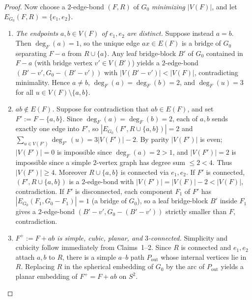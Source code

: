 \documentclass[11pt,reqno]{amsart}
\theoremstyle{plain}
\theoremstyle{definition}
\theoremstyle{remark}
\DeclareRobustCommand{\_}{\ifmmode\text{\textunderscore}\else\textunderscore\allowbreak\fi}
\begin{document}
\begin{proof}
Now choose a $2$-edge-bond $(F, R)$ of $G_0$ \emph{minimizing $|V(F)|$}, and let $E_{G_0}(F, R) = \{e_1, e_2\}$.
\begin{enumerate}[label=\textbf{Claim \arabic*.},leftmargin=4.8em]
  \item \emph{The endpoints $a, b \in V(F)$ of $e_1, e_2$ are distinct.} Suppose instead $a = b$. Then $\deg_F(a) = 1$, so the unique edge $ax \in E(F)$ is a bridge of $G_0$ separating $F - a$ from $R \cup \{a\}$. Any leaf bridge-block $B'$ of $G_0$ contained in $F - a$ (with bridge vertex $v' \in V(B')$) yields a $2$-edge-bond $(B' - v', G_0 - (B' - v'))$ with $|V(B' - v')| < |V(F)|$, contradicting minimality. Hence $a \neq b$, $\deg_F(a) = \deg_F(b) = 2$, and $\deg_F(u) = 3$ for all $u \in V(F) \setminus \{a, b\}$.

  \item \emph{$ab \notin E(F)$.} Suppose for contradiction that $ab \in E(F)$, and set $F' := F - \{a, b\}$. Since $\deg_F(a) = \deg_F(b) = 2$, each of $a, b$ sends exactly one edge into $F'$, so $|E_{G_0}(F', R \cup \{a, b\})| = 2$ and $\sum_{u \in V(F')} \deg_{F'}(u) = 3|V(F')| - 2$. By parity $|V(F')|$ is even; $|V(F')| = 0$ is impossible since $\deg_F(a) = 2 > 1$, and $|V(F')| = 2$ is impossible since a simple $2$-vertex graph has degree sum $\le 2 < 4$. Thus $|V(F')| \ge 4$. Moreover $R \cup \{a, b\}$ is connected via $e_1, e_2$. If $F'$ is connected, $(F', R \cup \{a, b\})$ is a $2$-edge-bond with $|V(F')| = |V(F)| - 2 < |V(F)|$, contradiction. If $F'$ is disconnected, each component $F_1$ of $F'$ has $|E_{G_0}(F_1, G_0 - F_1)| = 1$ (a bridge of $G_0$), so a leaf bridge-block $B'$ inside $F_1$ gives a $2$-edge-bond $(B' - v', G_0 - (B' - v'))$ strictly smaller than $F$, contradiction.

  \item \emph{$F^+ := F + ab$ is simple, cubic, planar, and $3$-connected.} Simplicity and cubicity follow immediately from Claims~1--2. Since $R$ is connected and $e_1, e_2$ attach $a, b$ to $R$, there is a simple $a$--$b$ path $P_{\mathrm{out}}$ whose internal vertices lie in $R$. Replacing $R$ in the spherical embedding of $G_0$ by the arc of $P_{\mathrm{out}}$ yields a planar embedding of $F^+ = F + ab$ on $S^2$.


\end{enumerate}
\end{proof}
\end{document}
